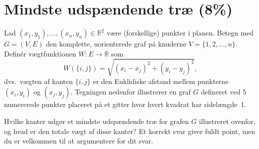 \newpage
\section{Mindste udspændende træ (8\%)}\label{sec:last}

Lad $(x_1,y_1),\ldots,(x_n,y_n) \in \mathbb{R}^2$ være (forskellige) punkter i planen.
Betegn med $G = (V,E)$ den komplette, uorienterede graf på knuderne $V = \{1,2,\ldots,n\}$. 
Definér vægtfunktionen $W : E \to \mathbb{R}$ som
$$W(\{i,j\}) = \sqrt{(x_i-x_j)^2+(y_i-y_j)^2},$$
dvs.~vægten af kanten $\{i,j\}$ er den Euklidiske afstand mellem punkterne $(x_i,y_i)$ og $(x_j,y_j)$.
Tegningen nedenfor illustrerer en graf $G$ defineret ved 5 numererede punkter placeret på et gitter hvor hvert kvadrat har sidelængde~1.

\begin{center}
\end{center}

{Hvilke kanter udgør et mindste udspændende træ for grafen $G$ illustreret ovenfor, og hvad er den totale vægt af disse kanter? Et korrekt svar giver fuldt point, men du er velkommen til at argumentere for dit svar.}


